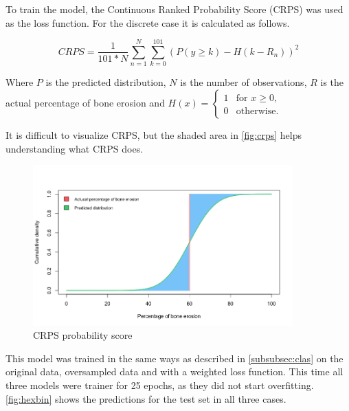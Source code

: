 \documentclass[12pt]{article}
\begin{document}
To train the model, the Continuous Ranked Probability Score (CRPS) was used as the loss function. For the discrete case it is calculated as follows. \cite{crps}

$$CRPS = \frac{1}{101 * N} \sum\limits_{n=1}^{N} \sum\limits_{k=0}^{101} (P(y \geq k) - H(k - R_n))^2$$

Where $P$ is the predicted distribution, $N$ is the number of observations, $R$ is the actual percentage of bone erosion and $H(x) = \begin{cases}
1 & \text{for $x \geq 0$,}\\
0 & \text{otherwise.}
\end{cases}$ \cite{crps}

It is difficult to visualize CRPS, but the shaded area in \autoref{fig:crps} helps understanding what CRPS does. \cite{crps}

\begin{figure}[ht]
\includegraphics[width=10cm]{crps}	
\caption{CRPS probability score}
\label{fig:crps}
\end{figure}

This model was trained in the same ways as described in \autoref{subsubsec:clas} on the original data, oversampled data and with a weighted loss function. This time all three models were trainer for 25 epochs, as they did not start overfitting. \autoref{fig:hexbin} shows the predictions for the test set in all three cases.
\end{document}

